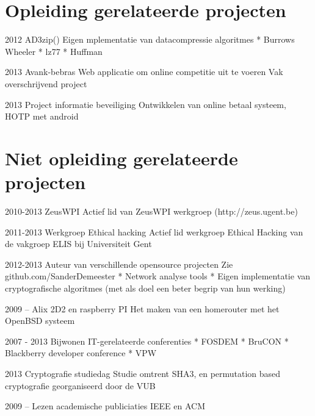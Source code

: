 \documentclass{tccv}
\begin{document}
\section{Opleiding gerelateerde projecten}
\begin{yearlist}
\item{2012}
	 {AD3zip()}
	 {Eigen mplementatie van datacompressie algoritmes\newline
	 * Burrows Wheeler\newline
	 * lz77\newline
	 * Huffman}	 
\item{2013}
	{Avank-bebras}
	{Web applicatie om online competitie uit te voeren
	Vak overschrijvend project}
\item{2013}
	 {Project informatie beveiliging}
	 {Ontwikkelen van online betaal systeem, HOTP met android}
\end{yearlist}

\section{Niet opleiding gerelateerde projecten}
\begin{yearlist}
\item{2010-2013}
	 {ZeusWPI}
	 {Actief lid van ZeusWPI werkgroep (http://zeus.ugent.be)}
	 
\item{2011-2013}
	 {Werkgroep Ethical hacking}
	 {Actief lid werkgroep Ethical Hacking van de vakgroep ELIS bij Universiteit Gent}
	 
\item{2012-2013}
	 {Auteur van verschillende opensource projecten}
	 {Zie github.com/SanderDemeester\newline
	 * Network analyse tools \newline
	 * Eigen implementatie van cryptografische algoritmes \newline
	 (met als doel een beter begrip van hun werking)}
	 
\item{2009 --}
	{Alix 2D2 en raspberry PI}
	{Het maken van een homerouter met het OpenBSD systeem}
	
\item{2007 - 2013}
	{Bijwonen IT-gerelateerde conferenties}
	{* FOSDEM \newline
	 * BruCON \newline
	 * Blackberry developer conference \newline
	 * VPW}
\item{2013}
	{Cryptografie studiedag} 
	{Studie omtrent SHA3, en permutation based cryptografie georganiseerd door de VUB}
\item{2009 -- }
	{Lezen academische publiciaties}
	{IEEE en ACM}
	
\end{yearlist}
\newpage
\end{document}
